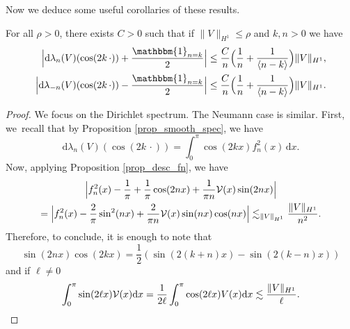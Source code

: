 Now we deduce some useful corollaries of these results.

\begin{lemma} \label{lem_est_der} For all $\rho>0$, there exists $C>0$ such that if $\|V\|_{H^1}\leq \rho$ and $k,n>0$ we have
\begin{align*}
\Bigl| \mathrm{d}\lambda_n(V)(\cos(2k\,\cdot )) + \frac{\mathbbm{1}_{n=k}}2 \Bigr|&\leq \frac C{n } \Bigl(\frac{1}n + \frac1{\langle n-k \rangle} \Bigr)\|V\|_{H^1},
\\
\Bigl| \mathrm{d}\lambda_{-n}(V)(\cos(2k\,\cdot )) - \frac{\mathbbm{1}_{n=k}}2 \Bigr|&\leq \frac C{n } \Bigl(\frac{1}n + \frac1{\langle n-k \rangle} \Bigr) \|V\|_{H^1}.
\end{align*}
\end{lemma}
\begin{proof} We focus on the Dirichlet spectrum. The Neumann case is similar.
First, we~recall that by Proposition \ref{prop_smooth_spec}, we have
\[
\mathrm{d}\lambda_n(V)(\cos(2k\,\cdot )) = \int_0^\pi \cos(2kx) f_n^2(x) \, \mathrm{d}x.
\]
Now, applying Proposition \ref{prop_desc_fn}, we have
\begin{multline*}
\Bigl|f_n^2(x) - \frac1\pi + \frac1\pi \cos(2nx) + \frac1{\pi n} \mathcal{V}(x) \sin(2n x) \Bigr| \\
=\Bigl|f_n^2(x) - \frac2\pi \sin^2(nx) + \frac2{\pi n} \mathcal{V}(x) \sin(n x) \cos(n x) \Bigr|
\lesssim_{\|V\|_{H^1}} \frac{\|V\|_{H^1}}{n^2}.
\end{multline*}
Therefore, to conclude, it is enough to note that
\[
\sin(2nx) \cos(2kx) = \frac12(\sin(2(k+n)x) - \sin(2(k-n)x))
\]
and if $\ell \neq 0$
\[
\int_0^\pi \sin(2\ell x) \mathcal{V}(x) \mathrm{d}x =\frac1{2\ell} \int_0^\pi \cos(2\ell x) V(x) \mathrm{d}x \lesssim \frac{\|V\|_{H^1}}{\ell}.\qedhere
\]
\end{proof}

